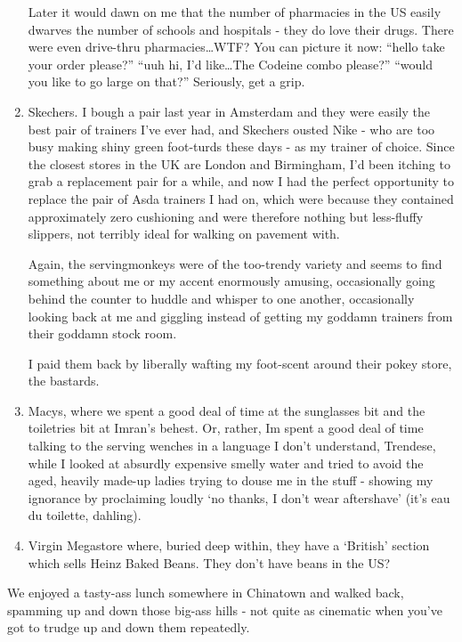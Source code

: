 \documentclass[a5paper,titlepage,draft]{book}
\begin{document}
\begin{enumerate}
Later it would dawn on me that the number of pharmacies in the US easily dwarves the number of schools and hospitals - they do love their drugs.  There were even drive-thru pharmacies\ldots WTF?  You can picture it now: ``hello take your order please?'' ``uuh hi, I'd like\ldots The Codeine combo please?'' ``would you like to go large on that?''  Seriously, get a grip.

\item Skechers.  I bough a pair last year in Amsterdam and they were easily the best pair of trainers I've ever had, and Skechers ousted Nike - who are too busy making shiny green foot-turds these days - as my trainer of choice.  Since the closest stores in the UK are London and Birmingham, I'd been itching to grab a replacement pair for a while, and now I had the perfect opportunity to replace the pair of  Asda trainers I had on, which were  because they contained approximately zero cushioning and were therefore nothing but less-fluffy slippers, not terribly ideal for walking on pavement with.

Again, the servingmonkeys were of the too-trendy variety and seems to find something about me or my accent enormously amusing, occasionally going behind the counter to huddle and whisper to one another, occasionally looking back at me and giggling instead of getting my goddamn trainers from their goddamn stock room.

I paid them back by liberally wafting my foot-scent around their pokey store, the bastards.

\item Macys, where we spent a good deal of time at the sunglasses bit and the toiletries bit at Imran's behest.  Or, rather, Im spent a good deal of time talking to the serving wenches in a language I don't understand, Trendese, while I looked at absurdly expensive smelly water and tried to avoid the aged, heavily made-up ladies trying to douse me in the stuff - showing my ignorance by proclaiming loudly `no thanks, I don't wear aftershave' (it's eau du toilette, dahling).

\item Virgin Megastore where, buried deep within, they have a `British' section which sells Heinz Baked Beans.  They don't have beans in the US?
\end{enumerate}

We enjoyed a tasty-ass lunch somewhere in Chinatown and walked back, spamming up and down those big-ass hills - not quite as cinematic when you've got to trudge up and down them repeatedly.
\end{document}
